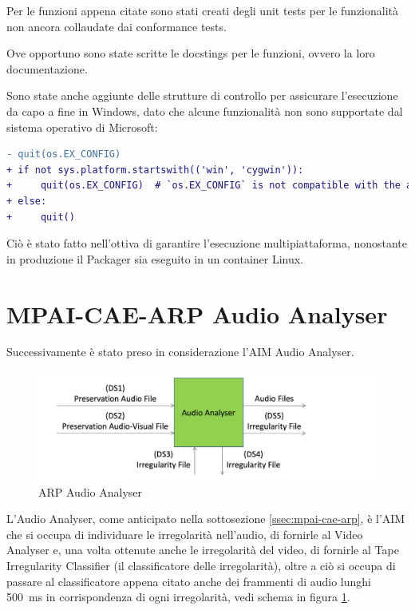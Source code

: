 Per le funzioni appena citate sono stati creati degli unit tests per le funzionalità non ancora collaudate dai conformance tests.

Ove opportuno sono state scritte le docstings per le funzioni, ovvero la loro documentazione.

Sono state anche aggiunte delle strutture di controllo per assicurare l'esecuzione da capo a fine in Windows, dato che alcune funzionalità non sono supportate dal sistema operativo di Microsoft:
\begin{lstlisting}[language=diff, caption=Modifiche per permettere la compatibilità di Packager con Windows]
- quit(os.EX_CONFIG)
+ if not sys.platform.startswith(('win', 'cygwin')):
+     quit(os.EX_CONFIG)  # `os.EX_CONFIG` is not compatible with the above platforms in Python 3.10
+ else:
+     quit()
\end{lstlisting}
Ciò è stato fatto nell'ottiva di garantire l'esecuzione multipiattaforma, nonostante in produzione il Packager sia eseguito in un container Linux.


\section{MPAI-CAE-ARP Audio Analyser} \label{sec:test-audioanalyser}
Successivamente è stato preso in considerazione l'\ac{AIM} Audio Analyser.

\begin{figure}[H]
    \centering
    \includegraphics{img/audioanalyser.png}
    \caption{\ac{ARP} Audio Analyser}
    \label{fig:audio-analyser}
\end{figure}

L'Audio Analyser, come anticipato nella sottosezione \ref{ssec:mpai-cae-arp}, è l'\ac{AIM} che si occupa di individuare le irregolarità nell'audio, di fornirle al Video Analyser e, una volta ottenute anche le irregolarità del video, di fornirle al Tape Irregularity Classifier (il classificatore delle irregolarità), oltre a ciò si occupa di passare al classificatore appena citato anche dei frammenti di audio lunghi \qty{500}{\ms} in corrispondenza di ogni irregolarità, vedi schema in figura \ref{fig:audio-analyser}.

